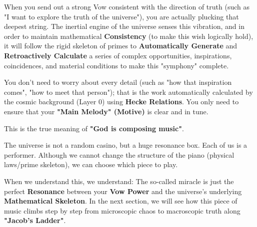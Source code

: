 When you send out a strong Vow consistent with the direction of truth (such as "I want to explore the truth of the universe"), you are actually plucking that deepest string. The inertial engine of the universe senses this vibration, and in order to maintain mathematical \textbf{Consistency} (to make this wish logically hold), it will follow the rigid skeleton of primes to \textbf{Automatically Generate} and \textbf{Retroactively Calculate} a series of complex opportunities, inspirations, coincidences, and material conditions to make this "symphony" complete.

You don't need to worry about every detail (such as "how that inspiration comes", "how to meet that person"); that is the work automatically calculated by the cosmic background (Layer 0) using \textbf{Hecke Relations}. You only need to ensure that your \textbf{"Main Melody" (Motive)} is clear and in tune.

This is the true meaning of \textbf{"God is composing music"}.

The universe is not a random casino, but a huge resonance box. Each of us is a performer. Although we cannot change the structure of the piano (physical laws/prime skeleton), we can choose which piece to play.

When we understand this, we understand: The so-called miracle is just the perfect \textbf{Resonance} between your \textbf{Vow Power} and the universe's underlying \textbf{Mathematical Skeleton}. In the next section, we will see how this piece of music climbs step by step from microscopic chaos to macroscopic truth along \textbf{"Jacob's Ladder"}.

